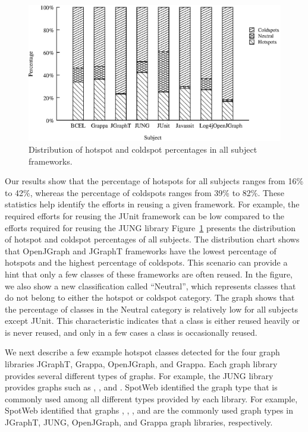 \begin{figure}[t]
\centering
\includegraphics[scale=0.65,clip]{figs/hotanddeadstats.eps}
\caption{\label{fig:hotdeadstats} Distribution of hotspot and coldspot percentages in all subject frameworks.} 
\end{figure}

Our results show that the percentage of hotspots for all subjects
ranges from 16\% to 42\%, whereas the percentage of coldspots ranges
from 39\% to 82\%. These statistics help identify the efforts in reusing 
a given framework. For example, the required efforts for reusing 
the JUnit framework can be low compared to the efforts required for reusing
the JUNG library 
Figure~\ref{fig:hotdeadstats} presents the
distribution of hotspot and coldspot percentages of all subjects. 
The distribution chart shows that OpenJGraph and JGraphT frameworks
have the lowest percentage of hotspots and the highest percentage of
coldspots. This scenario can provide a hint that only a few classes of these
frameworks are often reused. In the figure, we also show a new classification called
``Neutral'', which represents classes that do not belong to either
the hotspot or coldspot category. The graph shows that the
percentage of classes in the Neutral category is relatively low for
all subjects except JUnit. This characteristic indicates that a class
is either reused heavily or is never reused, and only in a few cases
a class is occasionally reused.

We next describe a few example hotspot classes detected for the four graph libraries
JGraphT, Grappa, OpenJGraph, and Grappa. Each graph library provides several
different types of graphs. For example, the JUNG library provides 
graphs such as , ,
and .  SpotWeb identified the graph type that is commonly
used among all different types provided by each library. For example, SpotWeb
identified that graphs , , ,
and  are the commonly used graph types in JGraphT, JUNG, OpenJGraph, and Grappa
graph libraries, respectively. 
